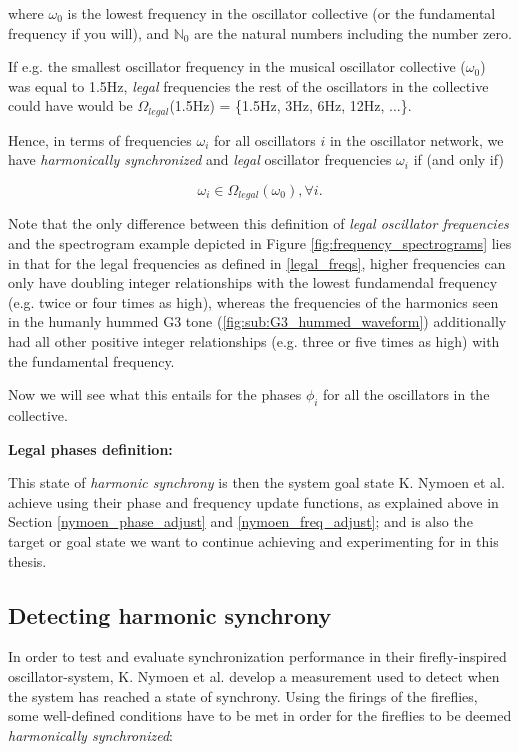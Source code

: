 where $\omega_{0}$ is the lowest frequency in the oscillator collective (or the fundamental frequency if you will), and $\mathbb{N}_0$ are the natural numbers including the number zero. \nl

If e.g. the smallest oscillator frequency in the musical oscillator collective ($\omega_0$) was equal to 1.5Hz, \textit{legal} frequencies the rest of the oscillators in the collective could have would be $\Omega_{legal}$(1.5Hz) = \{1.5Hz, 3Hz, 6Hz, 12Hz, ...\}.

Hence, in terms of frequencies $\omega_i$ for all oscillators $i$ in the oscillator network, we have \textit{harmonically synchronized} and \textit{legal} oscillator frequencies $\omega_i$ if (and only if)

\begin{equation}\label{synced_freqs}
\omega_i \in \Omega_{legal}(\omega_0) , \forall i.
\end{equation} \nl

Note that the only difference between this definition of \textit{legal oscillator frequencies} and the spectrogram example depicted in Figure \ref{fig:frequency_spectrograms} lies in that for the legal frequencies as defined in \eqref{legal_freqs}, higher frequencies can only have doubling integer relationships with the lowest fundamendal frequency (e.g. twice or four times as high), whereas the frequencies of the harmonics seen in the humanly hummed G3 tone (\ref{fig:sub:G3_hummed_waveform}) additionally had all other positive integer relationships (e.g. three or five times as high) with the fundamental frequency.

Now we will see what this entails for the phases $\phi_i$ for all the oscillators in the collective. \nl

\textbf{Legal phases definition:} \nl

 \nl

This state of \textit{harmonic synchrony} is then the system goal state K. Nymoen et al. achieve using their phase and frequency update functions, as explained above in Section \ref{nymoen_phase_adjust} and \ref{nymoen_freq_adjust}; and is also the target or goal state we want to continue achieving and experimenting for in this thesis.


	\subsection{Detecting harmonic synchrony}
	\label{baseline:subsec:detecting_harmonic_sync}
	In order to test and evaluate synchronization performance in their firefly-inspired oscillator-system, K. Nymoen et al. \cite{nymoen_synch} develop a measurement used to detect when the system has reached a state of synchrony. Using the firings of the fireflies, some well-defined conditions have to be met in order for the fireflies to be deemed \textit{harmonically synchronized}: \nl
	
